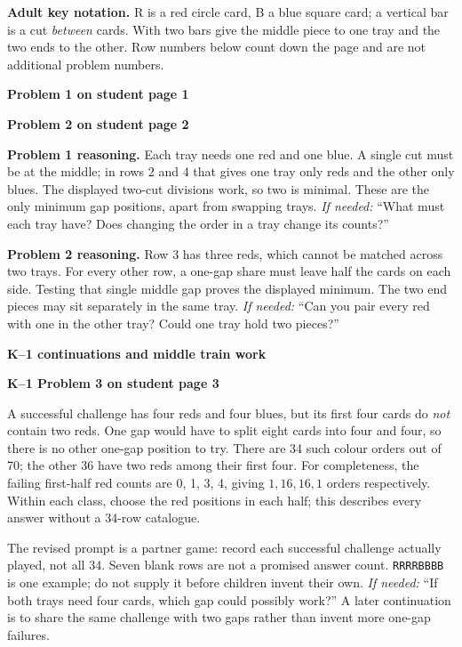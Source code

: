 \documentclass[11pt]{article}
\newcommand{\head}[1]{\par\textbf{\large #1}\par}
\newcommand{\sub}[1]{\par\textbf{#1}\par}
\newcommand{\hint}[1]{\textit{If needed:} #1}
\newcommand{\seq}[1]{\texttt{#1}}
\begin{document}
\textbf{Adult key notation.} R is a red circle card, B a blue square card; a vertical bar is a cut \emph{between} cards. With two bars give the middle piece to one tray and the two ends to the other. Row numbers below count down the page and are not additional problem numbers.

\begin{minipage}[t]{.46\linewidth}
\sub{Problem 1 on student page 1}
\small\ktable
\end{minipage}\hfill
\begin{minipage}[t]{.50\linewidth}
\sub{Problem 2 on student page 2}
\small\ksecond
\end{minipage}

\textbf{Problem 1 reasoning.} Each tray needs one red and one blue. A single cut must be at the middle; in rows 2 and 4 that gives one tray only reds and the other only blues. The displayed two-cut divisions work, so two is minimal. These are the only minimum gap positions, apart from swapping trays. \hint{``What must each tray have? Does changing the order in a tray change its counts?''}

\textbf{Problem 2 reasoning.} Row 3 has three reds, which cannot be matched across two trays. For every other row, a one-gap share must leave half the cards on each side. Testing that single middle gap proves the displayed minimum. The two end pieces may sit separately in the same tray. \hint{``Can you pair every red with one in the other tray? Could one tray hold two pieces?''}
\newpage
\head{K--1 continuations and middle train work}
\sub{K--1 Problem 3 on student page 3}
A successful challenge has four reds and four blues, but its first four cards do \emph{not} contain two reds. One gap would have to split eight cards into four and four, so there is no other one-gap position to try. There are 34 such colour orders out of 70; the other 36 have two reds among their first four. For completeness, the failing first-half red counts are 0, 1, 3, 4, giving $1,16,16,1$ orders respectively. Within each class, choose the red positions in each half; this describes every answer without a 34-row catalogue.

The revised prompt is a partner game: record each successful challenge actually played, not all 34. Seven blank rows are not a promised answer count. \seq{RRRRBBBB} is one example; do not supply it before children invent their own. \hint{``If both trays need four cards, which gap could possibly work?''} A later continuation is to share the same challenge with two gaps rather than invent more one-gap failures.
\end{document}
